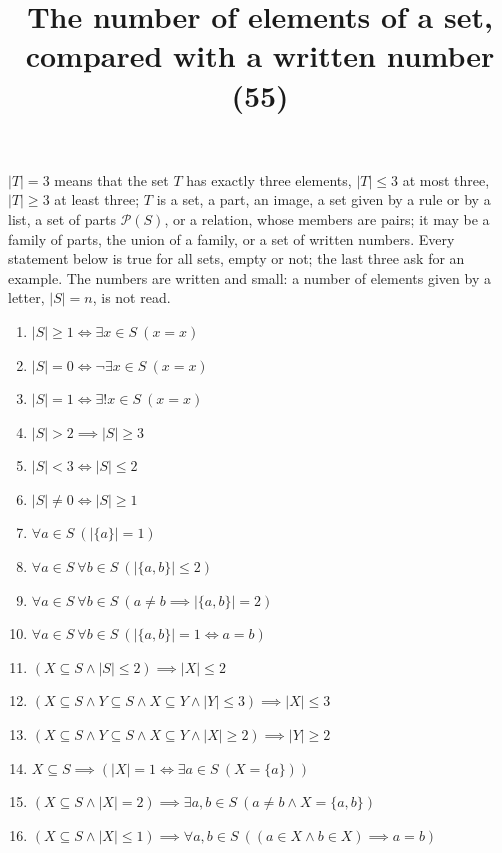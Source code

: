 \documentclass[11pt,a4paper]{article}
\title{The number of elements of a set, compared with a written number (55)}
\author{}
\date{}
\begin{document}
\maketitle
$|T| = 3$ means that the set $T$ has exactly three elements, $|T| \le 3$ at most three, $|T| \ge 3$ at least three; $T$ is a set, a part, an image, a set given by a rule or by a list, a set of parts $\mathcal{P}(S)$, or a relation, whose members are pairs; it may be a family of parts, the union of a family, or a set of written numbers. Every statement below is true for all sets, empty or not; the last three ask for an example. The numbers are written and small: a number of elements given by a letter, $|S| = n$, is not read.

\begin{enumerate}
\item $\displaystyle |S| \ge 1 \iff \exists x \in S\ (x = x)$
\item $\displaystyle \left| S \right| = 0 \iff \lnot \exists x \in S\ (x = x)$
\item $\displaystyle |S| = 1 \iff \exists! x \in S\ (x = x)$
\item $\displaystyle |S| > 2 \implies |S| \ge 3$
\item $\displaystyle |S| < 3 \iff |S| \le 2$
\item $\displaystyle |S| \neq 0 \iff |S| \ge 1$
\item $\displaystyle \forall a \in S\ (|\{a\}| = 1)$
\item $\displaystyle \forall a \in S\ \forall b \in S\ (|\{a, b\}| \le 2)$
\item $\displaystyle \forall a \in S\ \forall b \in S\ (a \neq b \implies |\{a, b\}| = 2)$
\item $\displaystyle \forall a \in S\ \forall b \in S\ (|\{a, b\}| = 1 \iff a = b)$
\item $\displaystyle (X \subseteq S \land |S| \le 2) \implies |X| \le 2$
\item $\displaystyle (X \subseteq S \land Y \subseteq S \land X \subseteq Y \land |Y| \le 3) \implies |X| \le 3$
\item $\displaystyle (X \subseteq S \land Y \subseteq S \land X \subseteq Y \land |X| \ge 2) \implies |Y| \ge 2$
\item $\displaystyle X \subseteq S \implies (|X| = 1 \iff \exists a \in S\ (X = \{a\}))$
\item $\displaystyle (X \subseteq S \land |X| = 2) \implies \exists a, b \in S\ (a \neq b \land X = \{a, b\})$
\item $\displaystyle (X \subseteq S \land |X| \le 1) \implies \forall a, b \in S\ ((a \in X \land b \in X) \implies a = b)$

\end{enumerate}
\end{document}
